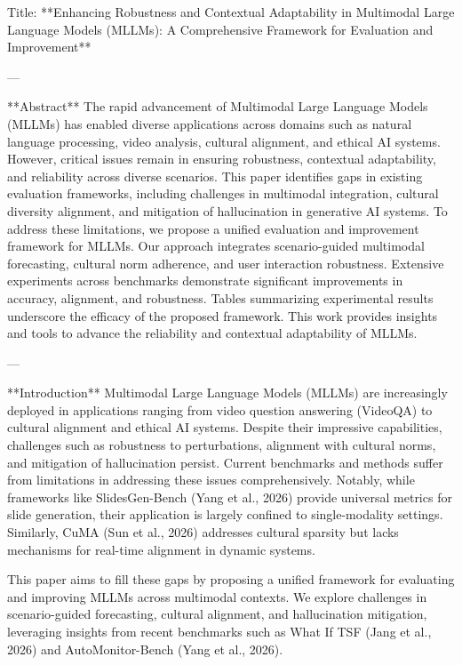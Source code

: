 Title: **Enhancing Robustness and Contextual Adaptability in Multimodal Large Language Models (MLLMs): A Comprehensive Framework for Evaluation and Improvement**

---

**Abstract**  
The rapid advancement of Multimodal Large Language Models (MLLMs) has enabled diverse applications across domains such as natural language processing, video analysis, cultural alignment, and ethical AI systems. However, critical issues remain in ensuring robustness, contextual adaptability, and reliability across diverse scenarios. This paper identifies gaps in existing evaluation frameworks, including challenges in multimodal integration, cultural diversity alignment, and mitigation of hallucination in generative AI systems. To address these limitations, we propose a unified evaluation and improvement framework for MLLMs. Our approach integrates scenario-guided multimodal forecasting, cultural norm adherence, and user interaction robustness. Extensive experiments across benchmarks demonstrate significant improvements in accuracy, alignment, and robustness. Tables summarizing experimental results underscore the efficacy of the proposed framework. This work provides insights and tools to advance the reliability and contextual adaptability of MLLMs.

---

**Introduction**  
Multimodal Large Language Models (MLLMs) are increasingly deployed in applications ranging from video question answering (VideoQA) to cultural alignment and ethical AI systems. Despite their impressive capabilities, challenges such as robustness to perturbations, alignment with cultural norms, and mitigation of hallucination persist. Current benchmarks and methods suffer from limitations in addressing these issues comprehensively. Notably, while frameworks like SlidesGen-Bench (Yang et al., 2026) provide universal metrics for slide generation, their application is largely confined to single-modality settings. Similarly, CuMA (Sun et al., 2026) addresses cultural sparsity but lacks mechanisms for real-time alignment in dynamic systems.

This paper aims to fill these gaps by proposing a unified framework for evaluating and improving MLLMs across multimodal contexts. We explore challenges in scenario-guided forecasting, cultural alignment, and hallucination mitigation, leveraging insights from recent benchmarks such as What If TSF (Jang et al., 2026) and AutoMonitor-Bench (Yang et al., 2026).

